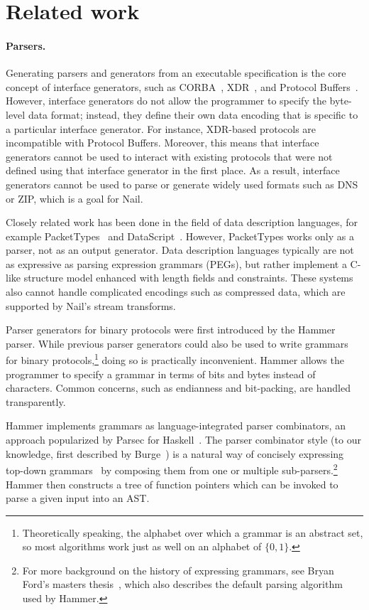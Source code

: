 \section{Related work}
\label{s:relwk}

\paragraph{Parsers.}

Generating parsers and generators from an executable specification is the
core concept of interface generators, such as CORBA~\cite{omg:corba},
XDR~\cite{rfc:1832}, and Protocol Buffers~\cite{varda2008}.  However,
interface generators do not allow the programmer to specify the byte-level
data format; instead, they define their own data encoding that is
specific to a particular interface generator.  For instance, XDR-based
protocols are incompatible with Protocol Buffers.  Moreover, this means
that interface generators cannot be used to interact with existing protocols
that were not defined using that interface generator in the first place.
As a result, interface generators cannot be used to parse or generate
widely used formats such as DNS or ZIP, which is a goal for Nail.

Closely related work has been done in the field of data description languages, for example
PacketTypes~\cite{mccann2000packet} and DataScript~\cite{DataScript}. However, PacketTypes works
only as a parser, not as an output generator. Data description languages typically are not as
expressive as parsing expression grammars (PEGs), but rather implement a C-like structure model
enhanced with length fields and constraints. These systems also cannot handle complicated encodings
such as compressed data, which are supported by Nail's stream transforms.

Parser generators for binary protocols were first introduced by the
Hammer~\cite{hammer-parser} parser.
While previous parser generators could also be used to write grammars
for binary protocols,\footnote{Theoretically speaking, the alphabet
over which a grammar is an abstract set, so most algorithms work
just as well on an alphabet of $\{0,1\}$.} doing so is practically
inconvenient. Hammer allows the programmer to specify a grammar in
terms of bits and bytes instead of characters. Common concerns, such as
endianness and bit-packing, are handled transparently. 

Hammer implements grammars as language-integrated parser combinators, an approach popularized by
Parsec for Haskell~\cite{LeijenMeijer:parsec}. The parser combinator style (to our knowledge, first
described by Burge~\cite{burge1975recursive}) is a natural way of concisely expressing top-down
grammars~\cite{Danielsson:2010:TPC:1863543.1863585}
by composing them from one or multiple sub-parsers.\footnote{For more
background on the history of expressing grammars, see Bryan Ford's
masters thesis~\cite{ford2002packrat}, which also describes the
default parsing algorithm used by Hammer.}
Hammer then constructs a tree of function pointers which can be invoked to parse a given input into
an AST\@.


